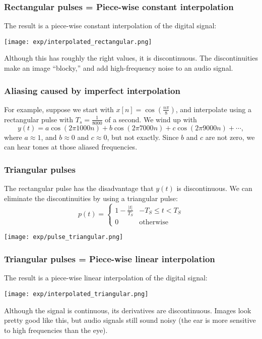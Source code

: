 \documentclass{beamer}
\begin{document}
\begin{frame}
  \frametitle{Rectangular pulses = Piece-wise constant interpolation}

  The result is a  piece-wise constant interpolation of the digital signal:

  \centerline{\texttt{[image: exp/interpolated\_rectangular.png]}}

  Although this has roughly the right values, it is discontinuous.
  The discontinuities make an image ``blocky,'' and add high-frequency
  noise to an audio signal.
\end{frame}

\begin{frame}
  \frametitle{Aliasing caused by imperfect interpolation}

  For example, suppose we start with
  $x[n]=\cos\left(\frac{n\pi}{8}\right)$, and interpolate using a
  rectangular pulse with $T_s=\frac{1}{8000}$ of a second.  We wind up
  with
  \begin{displaymath}
    y(t) = a\cos\left(2\pi 1000 n\right)+b\cos\left(2\pi 7000n\right)+c\cos\left(2\pi 9000n\right)+\cdots,
  \end{displaymath}
  where $a\approx 1$, and $b\approx 0$ and $c\approx 0$, but not
  exactly.  Since $b$ and $c$ are not zero, we can hear tones at those
  aliased frequencies.
\end{frame}

\begin{frame}
  \frametitle{Triangular pulses}

  The rectangular pulse has the disadvantage that $y(t)$ is discontinuous.
  We can eliminate the discontinuities by using a triangular pulse:
  \begin{displaymath}
    p(t) = \begin{cases}
      1-\frac{|t|}{T_S} & -T_S\le t<T_S\\
      0 & \mbox{otherwise}
    \end{cases}
  \end{displaymath}

  \centerline{\texttt{[image: exp/pulse\_triangular.png]}}  
\end{frame}

\begin{frame}
  \frametitle{Triangular pulses = Piece-wise linear interpolation}

  The result is a  piece-wise linear interpolation of the digital signal:

  \centerline{\texttt{[image: exp/interpolated\_triangular.png]}}

  Although the signal is continuous, its derivatives are
  discontinuous.  Images look pretty good like this, but audio signals
  still sound noisy (the ear is more sensitive to high frequencies
  than the eye).
\end{frame}
\end{document}
